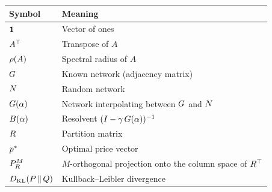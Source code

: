 

\begin{center}
\renewcommand{\arraystretch}{1.25}
\begin{tabular}{@{}ll@{}}
\toprule
Symbol & Meaning \\
\midrule
$\mathbf{1}$ & Vector of ones \\
$A^{\top}$ & Transpose of $A$ \\
$\rho(A)$ & Spectral radius of $A$ \\
$G$ & Known network (adjacency matrix) \\
$N$ & Random network \\
$G(\alpha)$ & Network interpolating between $G$ and $N$ \\
$B(\alpha)$ & Resolvent $(I - \gamma\,G(\alpha))^{-1}$ \\
$R$ & Partition matrix \\
$p^{*}$ & Optimal price vector \\
$P_{R}^{M}$ & $M$-orthogonal projection onto the column space of $R^{\top}$ \\
$D_{\mathrm{KL}}\!\left(P \,\middle\|\, Q\right)$ & Kullback--Leibler divergence \\
\bottomrule
\end{tabular}
\end{center}

